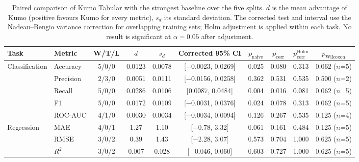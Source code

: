 \begin{table}[t]
\centering
\caption{Paired comparison of Kumo Tabular with the strongest baseline over the five splits. $\overline{d}$ is the mean advantage of Kumo (positive favours Kumo for every metric), $s_d$ its standard deviation. The corrected test and interval use the Nadeau--Bengio variance correction for overlapping training sets; Holm adjustment is applied within each task. No result is significant at $\alpha=0.05$ after adjustment.}
\label{tab:paired}
\setlength{\tabcolsep}{4.5pt}
\begin{tabular}{llcccccccc}
\toprule
Task & Metric & W/T/L & $\overline{d}$ & $s_d$ & Corrected 95\% CI & $p_{\mathrm{naive}}$ & $p_{\mathrm{corr}}$ & $p_{\mathrm{corr}}^{\mathrm{Holm}}$ & $p_{\mathrm{Wilcoxon}}$ \\
\midrule
Classification & Accuracy & 5/0/0 & 0.0123 & 0.0078 & [$-$0.0023, 0.0269] & 0.025 & 0.080 & 0.313 & 0.062 ($n$=5) \\
 & Precision & 2/3/0 & 0.0051 & 0.0111 & [$-$0.0156, 0.0258] & 0.362 & 0.531 & 0.535 & 0.500 ($n$=2) \\
 & Recall & 5/0/0 & 0.0286 & 0.0106 & [0.0087, 0.0484] & 0.004 & 0.016 & 0.081 & 0.062 ($n$=5) \\
 & F1 & 5/0/0 & 0.0172 & 0.0109 & [$-$0.0031, 0.0376] & 0.024 & 0.078 & 0.313 & 0.062 ($n$=5) \\
 & ROC-AUC & 4/1/0 & 0.0030 & 0.0034 & [$-$0.0034, 0.0094] & 0.126 & 0.267 & 0.535 & 0.125 ($n$=4) \\
\midrule
Regression & MAE & 4/0/1 & 1.27 & 1.10 & [$-$0.78, 3.32] & 0.061 & 0.161 & 0.484 & 0.125 ($n$=5) \\
 & RMSE & 3/0/2 & 0.39 & 1.43 & [$-$2.28, 3.07] & 0.573 & 0.704 & 1.000 & 0.625 ($n$=5) \\
 & $R^2$ & 3/0/2 & 0.007 & 0.028 & [$-$0.046, 0.060] & 0.603 & 0.727 & 1.000 & 0.625 ($n$=5) \\
\bottomrule
\end{tabular}
\end{table}

